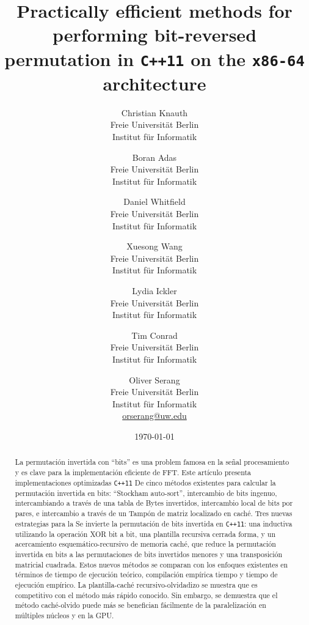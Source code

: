 ﻿\documentclass[10pt]{article}
\begin{document}
\title{Practically efficient methods for performing bit-reversed
  permutation in {\tt C++11} on the {\tt x86-64} architecture}

\author{Christian Knauth\\
Freie Universit\"at Berlin\\
Institut f\"{u}r Informatik
\and
Boran Adas\\
Freie Universit\"at Berlin\\
Institut f\"{u}r Informatik
\and
Daniel Whitfield\\
Freie Universit\"at Berlin\\
Institut f\"{u}r Informatik
\and
Xuesong Wang\\
Freie Universit\"at Berlin\\
Institut f\"{u}r Informatik
\and
Lydia Ickler\\
Freie Universit\"at Berlin\\
Institut f\"{u}r Informatik
\and
Tim Conrad\\
Freie Universit\"at Berlin\\
Institut f\"{u}r Informatik
\and
Oliver Serang\\
Freie Universit\"at Berlin\\
Institut f\"{u}r Informatik\\
\url{orserang@uw.edu}
}

\date{{\small \today}}

\maketitle

\begin{abstract}
\noindent La permutación invertida con “bits” es una problem famosa en la señal procesamiento y es clave para la implementación eficiente de FFT. Este artículo presenta implementaciones optimizadas {\tt C++11} De cinco métodos existentes para calcular la permutación invertida en bits: “Stockham auto-sort”, intercambio de bits ingenuo, intercambiando a través de una tabla de Bytes invertidos, intercambio local de bits por pares, e intercambio a través de un Tampón de matriz localizado en caché. Tres nuevas estrategias para la Se invierte la permutación de bits invertida en {\tt C++11}: una inductiva utilizando la operación XOR bit a bit, una plantilla recursiva cerrada forma, y ​​un acercamiento esquemático-recursivo de memoria caché, que reduce la permutación invertida en bits a las permutaciones de bits invertidos menores y una transposición matricial cuadrada. Estos nuevos métodos se comparan con los enfoques existentes en términos de tiempo de ejecución teórico, compilación empírica tiempo y tiempo de ejecución empírico. La plantilla-caché recursivo-olvidadizo se muestra que es competitivo con el método más rápido conocido. Sin embargo, se demuestra que el método caché-olvido puede más se benefician fácilmente de la paralelización en múltiples núcleos y en la GPU.
\end{abstract}
\end{document}
